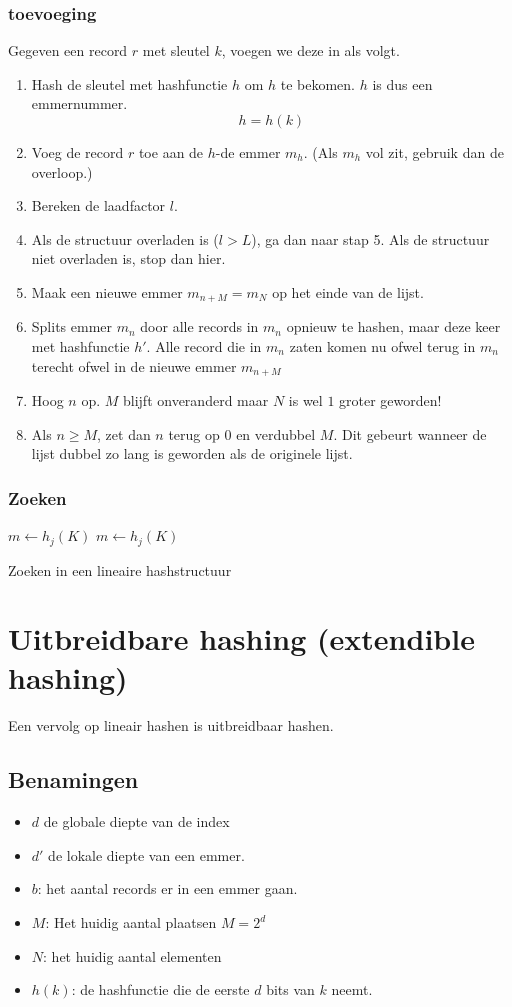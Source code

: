 \documentclass[hashing.tex]{subfiles}
\begin{document}
\subsubsection{toevoeging}
Gegeven een record $r$ met sleutel $k$, voegen we deze in als volgt.
\begin{enumerate}
\item Hash de sleutel met hashfunctie $h$ om $h$ te bekomen. $h$ is dus een emmernummer.
\[
h = h(k)
\]
\item Voeg de record $r$ toe aan de $h$-de emmer $m_h$. (Als $m_h$ vol zit, gebruik dan de overloop.)
\item Bereken de laadfactor $l$. 
\item Als de structuur overladen is ($l> L$), ga dan naar stap 5. Als de structuur niet overladen is, stop dan hier.
\item Maak een nieuwe emmer $m_{n+M}= m_{N}$ op het einde van de lijst.
\item Splits emmer $m_n$ door alle records in $m_n$ opnieuw te hashen, maar deze keer met hashfunctie $h'$. Alle record die in $m_n$ zaten komen nu ofwel terug in $m_n$ terecht ofwel in de nieuwe emmer $m_{n+M}$
\item Hoog $n$ op. $M$ blijft onveranderd maar $N$ is wel $1$ groter geworden!
\item Als $n \ge M$, zet dan $n$ terug op $0$ en verdubbel $M$. Dit gebeurt wanneer de lijst dubbel zo lang is geworden als de originele lijst.

\end{enumerate}


\subsubsection{Zoeken}
\begin{algorithm}
{$m \leftarrow h_{j}(K)$}
{$m \leftarrow h_{j}(K)$\\
}
\caption{Zoeken in een lineaire hashstructuur}
\end{algorithm}


\section{Uitbreidbare hashing (extendible hashing)}
Een vervolg op lineair hashen is uitbreidbaar hashen.
\subsection{Benamingen}
\begin{itemize}
\item $d$ de globale diepte van de index
\item $d'$ de lokale diepte van een emmer.
\item $b$: het aantal records er in een emmer gaan.
\item $M$: Het huidig aantal plaatsen $M = 2^{d}$
\item $N$: het huidig aantal elementen
\item $h(k)$: de hashfunctie die de eerste $d$ bits van $k$ neemt.
\end{itemize}
\end{document}
